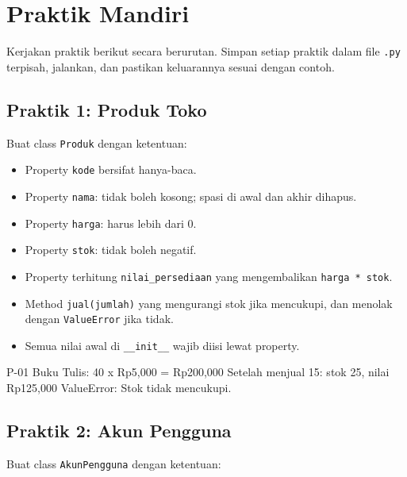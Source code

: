 \section{Praktik Mandiri}

Kerjakan praktik berikut secara berurutan. Simpan setiap praktik dalam file \texttt{.py} terpisah, jalankan, dan pastikan keluarannya sesuai dengan contoh.

\subsection{Praktik 1: Produk Toko}

Buat class \texttt{Produk} dengan ketentuan:

\begin{itemize}
  \item Property \texttt{kode} bersifat hanya-baca.
  \item Property \texttt{nama}: tidak boleh kosong; spasi di awal dan akhir dihapus.
  \item Property \texttt{harga}: harus lebih dari 0.
  \item Property \texttt{stok}: tidak boleh negatif.
  \item Property terhitung \texttt{nilai\_persediaan} yang mengembalikan \texttt{harga * stok}.
  \item Method \texttt{jual(jumlah)} yang mengurangi stok jika mencukupi, dan menolak dengan \texttt{ValueError} jika tidak.
  \item Semua nilai awal di \texttt{\_\_init\_\_} wajib diisi lewat property.
\end{itemize}

\begin{keluaran}
P-01 Buku Tulis: 40 x Rp5,000 = Rp200,000
Setelah menjual 15: stok 25, nilai Rp125,000
ValueError: Stok tidak mencukupi.
\end{keluaran}

\subsection{Praktik 2: Akun Pengguna}

Buat class \texttt{AkunPengguna} dengan ketentuan:

